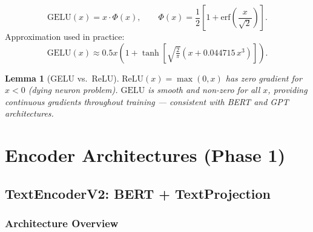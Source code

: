 \documentclass[12pt,a4paper]{article}
\theoremstyle{definition}
\theoremstyle{plain}
\newtheorem{lemma}[theorem]{Lemma}
\theoremstyle{remark}
\newcommand{\GELU}{\mathrm{GELU}}
\begin{document}
\[
  \GELU(x) = x \cdot \Phi(x), \qquad
  \Phi(x) = \frac{1}{2}\left[1 + \mathrm{erf}\!\left(\frac{x}{\sqrt{2}}\right)\right].
\]
Approximation used in practice:
\[
  \GELU(x) \approx 0.5x\left(1 + \tanh\!\left[\sqrt{\tfrac{2}{\pi}}\left(x + 0.044715\,x^3\right)\right]\right).
\]

\begin{lemma}[GELU vs.\ ReLU]
  $\mathrm{ReLU}(x) = \max(0,x)$ has zero gradient for $x < 0$ (dying neuron problem).
  $\GELU$ is smooth and non-zero for all $x$, providing continuous gradients throughout
  training — consistent with BERT and GPT architectures.
\end{lemma}

\newpage
\section{Encoder Architectures (Phase 1)}

\subsection{TextEncoderV2: BERT + TextProjection}

\subsubsection{Architecture Overview}
\end{document}
